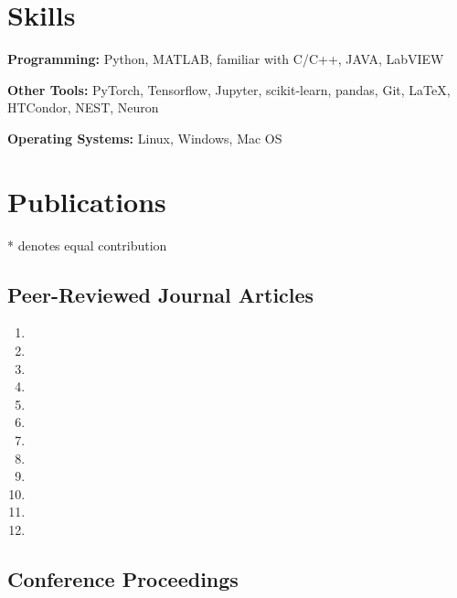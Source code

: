 \documentclass[10pt,letterpaper]{article}
\begin{document}
\section*{Skills}
\vspace{-0.05in}
\hspace{1.5em}\textbf{Programming:} Python, MATLAB, familiar with C/C++, JAVA, LabVIEW

\hspace{1.5em}\textbf{Other Tools:} PyTorch, Tensorflow, Jupyter, scikit-learn, pandas, Git, \LaTeX, HTCondor, NEST, Neuron

\hspace{1.5em}\textbf{Operating Systems:} Linux, Windows, Mac OS

\clearpage

\section*{Publications}

* denotes equal contribution

\vspace{-0.05in}


\subsection*{Peer-Reviewed Journal Articles}

\begin{enumerate}
\item {}
\item {}
\item {}
\item {}
\item {}
\item {}
\item {}
\item {}
\item {}
\item {}
\item {}
\item {}
\end{enumerate}

\subsection*{Conference Proceedings}
\end{document}
